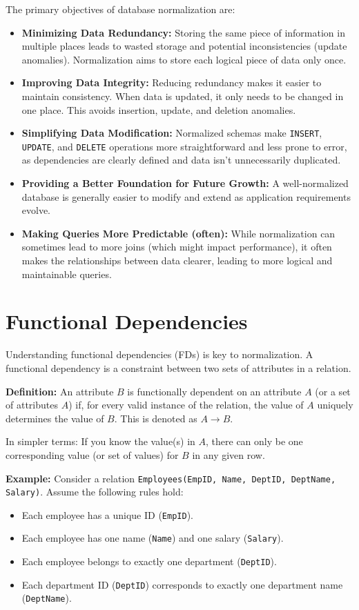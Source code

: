 \documentclass[12pt]{book}
\begin{document}
The primary objectives of database normalization are:
\begin{itemize}
    \item \textbf{Minimizing Data Redundancy:} Storing the same piece of information in multiple places leads to wasted storage and potential inconsistencies (update anomalies). Normalization aims to store each logical piece of data only once.
    \item \textbf{Improving Data Integrity:} Reducing redundancy makes it easier to maintain consistency. When data is updated, it only needs to be changed in one place. This avoids insertion, update, and deletion anomalies.
    \item \textbf{Simplifying Data Modification:} Normalized schemas make \texttt{INSERT}, \texttt{UPDATE}, and \texttt{DELETE} operations more straightforward and less prone to error, as dependencies are clearly defined and data isn't unnecessarily duplicated.
    \item \textbf{Providing a Better Foundation for Future Growth:} A well-normalized database is generally easier to modify and extend as application requirements evolve.
    \item \textbf{Making Queries More Predictable (often):} While normalization can sometimes lead to more joins (which might impact performance), it often makes the relationships between data clearer, leading to more logical and maintainable queries.
\end{itemize}

\section{Functional Dependencies}

Understanding functional dependencies (FDs) is key to normalization. A functional dependency is a constraint between two sets of attributes in a relation.

\textbf{Definition:}
An attribute $B$ is functionally dependent on an attribute $A$ (or a set of attributes $A$) if, for every valid instance of the relation, the value of $A$ uniquely determines the value of $B$. This is denoted as $A \rightarrow B$.

In simpler terms: If you know the value(s) in $A$, there can only be one corresponding value (or set of values) for $B$ in any given row.

\textbf{Example:}
Consider a relation \texttt{Employees(EmpID, Name, DeptID, DeptName, Salary)}.
Assume the following rules hold:
\begin{itemize}
    \item Each employee has a unique ID (\texttt{EmpID}).
    \item Each employee has one name (\texttt{Name}) and one salary (\texttt{Salary}).
    \item Each employee belongs to exactly one department (\texttt{DeptID}).
    \item Each department ID (\texttt{DeptID}) corresponds to exactly one department name (\texttt{DeptName}).
\end{itemize}
\end{document}
